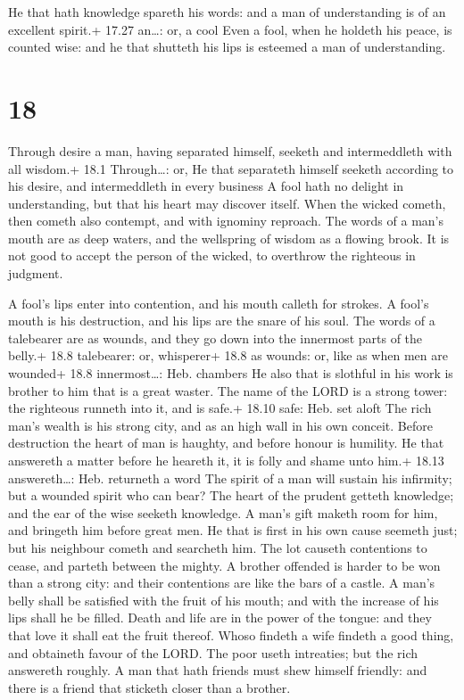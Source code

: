  He that hath knowledge spareth his words: and a man of
understanding is of an excellent spirit.+ 17.27 an\ldots: or, a cool
 Even a fool, when he holdeth his peace, is counted wise:
and he that shutteth his lips is esteemed a man of understanding.

\hypertarget{section-17}{%
\section{18}\label{section-17}}

 Through desire a man, having separated himself, seeketh and
intermeddleth with all wisdom.+ 18.1 Through\ldots: or, He that
separateth himself seeketh according to his desire, and intermeddleth in
every business  A fool hath no delight in understanding, but
that his heart may discover itself.  When the wicked cometh,
then cometh also contempt, and with ignominy reproach.  The
words of a man's mouth are as deep waters, and the wellspring of wisdom
as a flowing brook.  It is not good to accept the person of
the wicked, to overthrow the righteous in judgment.

 A fool's lips enter into contention, and his mouth calleth
for strokes.  A fool's mouth is his destruction, and his
lips are the snare of his soul.  The words of a talebearer
are as wounds, and they go down into the innermost parts of the belly.+
18.8 talebearer: or, whisperer+ 18.8 as wounds: or, like as when men are
wounded+ 18.8 innermost\ldots: Heb. chambers  He also that
is slothful in his work is brother to him that is a great waster.
 The name of the LORD is a strong tower: the righteous
runneth into it, and is safe.+ 18.10 safe: Heb. set aloft 
The rich man's wealth is his strong city, and as an high wall in his own
conceit.  Before destruction the heart of man is haughty,
and before honour is humility.  He that answereth a matter
before he heareth it, it is folly and shame unto him.+ 18.13
answereth\ldots: Heb. returneth a word  The spirit of a man
will sustain his infirmity; but a wounded spirit who can bear?
 The heart of the prudent getteth knowledge; and the ear of
the wise seeketh knowledge.  A man's gift maketh room for
him, and bringeth him before great men.  He that is first
in his own cause seemeth just; but his neighbour cometh and searcheth
him.  The lot causeth contentions to cease, and parteth
between the mighty.  A brother offended is harder to be won
than a strong city: and their contentions are like the bars of a castle.
 A man's belly shall be satisfied with the fruit of his
mouth; and with the increase of his lips shall he be filled.
 Death and life are in the power of the tongue: and they
that love it shall eat the fruit thereof.  Whoso findeth a
wife findeth a good thing, and obtaineth favour of the LORD.
 The poor useth intreaties; but the rich answereth roughly.
 A man that hath friends must shew himself friendly: and
there is a friend that sticketh closer than a brother.

